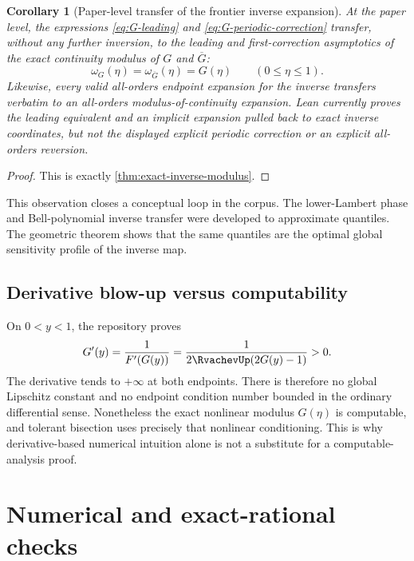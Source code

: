 \documentclass[11pt,oneside]{article}
\newtheorem{corollary}[theorem]{Corollary}
\theoremstyle{definition}
\theoremstyle{remark}
\numberwithin{equation}{section}
\newcommand{\InvT}{\overline G}
\begin{document}
\begin{corollary}[Paper-level transfer of the frontier inverse expansion]
\label{cor:sharp-asymptotic-modulus}
At the paper level, the expressions \eqref{eq:G-leading} and
\eqref{eq:G-periodic-correction} transfer, without any further inversion, to
the leading and first-correction asymptotics of the exact continuity modulus
of $G$ and $\InvT$:
\begin{equation}\label{eq:asymptotic-modulus}
 \omega_G(\eta)=\omega_{\InvT}(\eta)=G(\eta)
 \qquad(0\le\eta\le1).
\end{equation}
Likewise, every valid all-orders endpoint expansion for the inverse transfers
verbatim to an all-orders modulus-of-continuity expansion.  Lean currently
proves the leading equivalent and an implicit expansion pulled back to exact
inverse coordinates, but not the displayed explicit periodic correction or
an explicit all-orders reversion.
\end{corollary}

\begin{proof}
This is exactly \cref{thm:exact-inverse-modulus}.
\end{proof}

This observation closes a conceptual loop in the corpus.  The lower-Lambert
phase and Bell-polynomial inverse transfer were developed to approximate
quantiles.  The geometric theorem shows that the same quantiles are the
optimal global sensitivity profile of the inverse map.

\subsection{Derivative blow-up versus computability}

On $0<y<1$, the repository proves
\begin{equation}\label{eq:inverse-derivative}
 G'(y)=\frac{1}{F'(G(y))}
 =\frac{1}{2\RvachevUp(2G(y)-1)}>0.
\end{equation}
The derivative tends to $+\infty$ at both endpoints.  There is therefore no
global Lipschitz constant and no endpoint condition number bounded in the
ordinary differential sense.  Nonetheless the exact nonlinear modulus
$G(\eta)$ is computable, and tolerant bisection uses precisely that nonlinear
conditioning.  This is why derivative-based numerical intuition alone is not
a substitute for a computable-analysis proof.

\section{Numerical and exact-rational checks}
\end{document}
